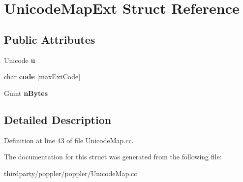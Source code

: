 \hypertarget{struct_unicode_map_ext}{}\section{Unicode\+Map\+Ext Struct Reference}
\label{struct_unicode_map_ext}
\subsection*{Public Attributes}
\begin{DoxyCompactItemize}
\item 
\mbox{\label{struct_unicode_map_ext_a6f06c1eefa48781bde63a261bfa31445}} 
Unicode {\bfseries u}
\item 
\mbox{\label{struct_unicode_map_ext_ac3e2c26640662ccc1b9d6b0896e81b70}} 
char {\bfseries code} \mbox{[}max\+Ext\+Code\mbox{]}
\item 
\mbox{\label{struct_unicode_map_ext_a62b0a2ded6f12d753e39e9fc6692bbdf}} 
Guint {\bfseries n\+Bytes}
\end{DoxyCompactItemize}


\subsection{Detailed Description}


Definition at line 43 of file Unicode\+Map.\+cc.



The documentation for this struct was generated from the following file\+:\begin{DoxyCompactItemize}
\item 
thirdparty/poppler/poppler/Unicode\+Map.\+cc\end{DoxyCompactItemize}
